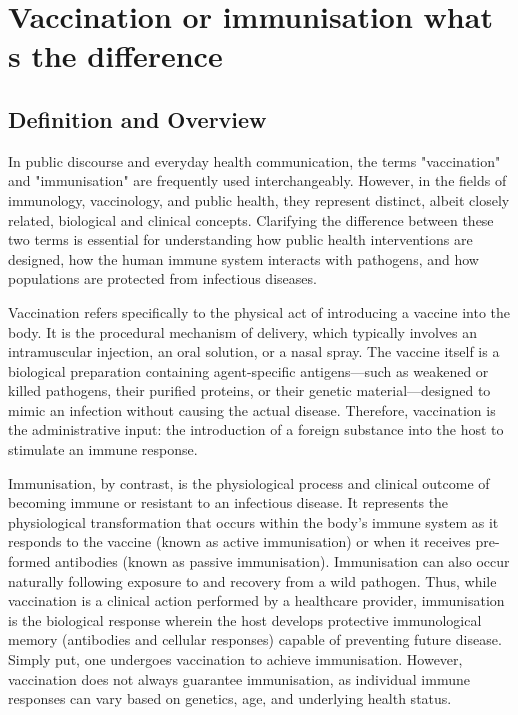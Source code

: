 \chapter{Vaccination or immunisation what s the difference}

\section*{Definition and Overview}
In public discourse and everyday health communication, the terms "vaccination" and "immunisation" are frequently used interchangeably. However, in the fields of immunology, vaccinology, and public health, they represent distinct, albeit closely related, biological and clinical concepts. Clarifying the difference between these two terms is essential for understanding how public health interventions are designed, how the human immune system interacts with pathogens, and how populations are protected from infectious diseases.

Vaccination refers specifically to the physical act of introducing a vaccine into the body. It is the procedural mechanism of delivery, which typically involves an intramuscular injection, an oral solution, or a nasal spray. The vaccine itself is a biological preparation containing agent-specific antigens—such as weakened or killed pathogens, their purified proteins, or their genetic material—designed to mimic an infection without causing the actual disease. Therefore, vaccination is the administrative input: the introduction of a foreign substance into the host to stimulate an immune response.

Immunisation, by contrast, is the physiological process and clinical outcome of becoming immune or resistant to an infectious disease. It represents the physiological transformation that occurs within the body's immune system as it responds to the vaccine (known as active immunisation) or when it receives pre-formed antibodies (known as passive immunisation). Immunisation can also occur naturally following exposure to and recovery from a wild pathogen. Thus, while vaccination is a clinical action performed by a healthcare provider, immunisation is the biological response wherein the host develops protective immunological memory (antibodies and cellular responses) capable of preventing future disease. Simply put, one undergoes vaccination to achieve immunisation. However, vaccination does not always guarantee immunisation, as individual immune responses can vary based on genetics, age, and underlying health status.

